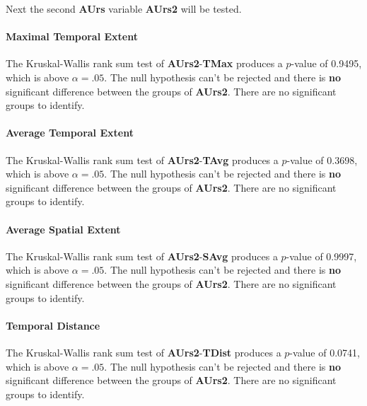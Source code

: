 \medskip
Next the second \textbf{AUrs} variable \textbf{AUrs2} will be tested.
\medskip

\paragraph{Maximal Temporal Extent}
The Kruskal-Wallis rank sum test of \textbf{AUrs2}-\textbf{TMax} produces a $p$-value of 0.9495, which is above $\alpha=.05$. The null hypothesis can't be rejected and there is \textbf{no} significant difference between the groups of \textbf{AUrs2}. There are no significant groups to identify.

\paragraph{Average Temporal Extent}
The Kruskal-Wallis rank sum test of \textbf{AUrs2}-\textbf{TAvg} produces a $p$-value of 0.3698, which is above $\alpha=.05$. The null hypothesis can't be rejected and there is \textbf{no} significant difference between the groups of \textbf{AUrs2}. There are no significant groups to identify.

\paragraph{Average Spatial Extent}
The Kruskal-Wallis rank sum test of \textbf{AUrs2}-\textbf{SAvg} produces a $p$-value of 0.9997, which is above $\alpha=.05$. The null hypothesis can't be rejected and there is \textbf{no} significant difference between the groups of \textbf{AUrs2}. There are no significant groups to identify.

\paragraph{Temporal Distance}
The Kruskal-Wallis rank sum test of \textbf{AUrs2}-\textbf{TDist} produces a $p$-value of 0.0741, which is above $\alpha=.05$. The null hypothesis can't be rejected and there is \textbf{no} significant difference between the groups of \textbf{AUrs2}. There are no significant groups to identify.

